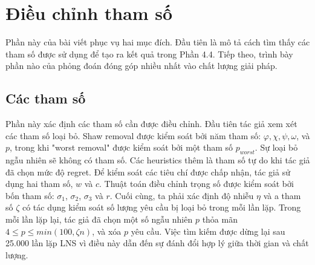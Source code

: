 \section{Điều chỉnh tham số}
Phần này của bài viết phục vụ hai mục đích. Đầu tiên là mô tả cách tìm thấy các tham số được sử dụng để tạo ra kết quả trong Phần 4.4. Tiếp theo, trình bày phần nào của phỏng đoán đóng góp nhiều nhất vào chất lượng giải pháp.

\subsection{Các tham số}
Phần này xác định các tham số cần được điều chỉnh. Đầu tiên tác giả xem xét các tham số loại bỏ. Shaw removal được kiểm soát bởi năm tham số: $\varphi, \chi, \psi, \omega$, và $p$, trong khi "worst removal" được kiểm soát bởi một tham số $p_{worst}$. Sự loại bỏ ngẫu nhiên sẽ không có tham số. Các heuristics thêm là tham số tự do khi tác giả đã chọn mức độ regret.
Để kiểm soát các tiêu chí được chấp nhận, tác giả sử dụng hai tham số, $w$ và $c$. Thuật toán điều chỉnh trọng số được kiểm soát bởi bốn tham số: $\sigma_1$, $\sigma_2$, $\sigma_3$ và $r$. Cuối cùng, ta phải xác định độ nhiễu $\eta$ và a tham số $\zeta$ có tác dụng kiểm soát số lượng yêu cầu bị loại bỏ trong mỗi lần lặp. Trong mỗi lần lặp lại, tác giả đã chọn một số ngẫu nhiên $p$ thỏa mãn $4 \leq p \leq min(100, \zeta n)$, và xóa $p$ yêu cầu. Việc tìm kiếm được dừng lại sau 25.000 lần lặp LNS vì điều này dẫn đến sự đánh đổi hợp lý giữa thời gian và chất lượng.

